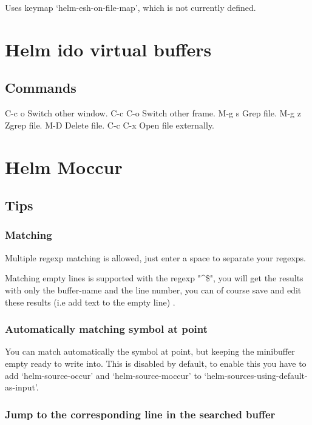 \documentclass[11pt]{article}
\begin{document}
Uses keymap ‘helm-esh-on-file-map’, which is not currently defined.


\section{Helm ido virtual buffers}
\label{sec:org6420dcb}

\subsection{Commands}
\label{sec:org91c0c1a}

C-c o		Switch other window.
C-c C-o		Switch other frame.
M-g s		Grep file.
M-g z		Zgrep file.
M-D		Delete file.
C-c C-x		Open file externally.

\section{Helm Moccur}
\label{sec:org0950258}

\subsection{Tips}
\label{sec:org87b887d}

\subsubsection{Matching}
\label{sec:orgb281e97}

Multiple regexp matching is allowed, just enter a space to separate your regexps.

Matching empty lines is supported with the regexp "\^{}\$", you will get the results
with only the buffer-name and the line number, you can of course save and edit these
results (i.e add text to the empty line) .

\subsubsection{Automatically matching symbol at point}
\label{sec:orga31fb17}

You can match automatically the symbol at point, but keeping
the minibuffer empty ready to write into.
This is disabled by default, to enable this you have to add ‘helm-source-occur’
and ‘helm-source-moccur’ to ‘helm-sources-using-default-as-input’.

\subsubsection{Jump to the corresponding line in the searched buffer}
\label{sec:org32a099e}
\end{document}
